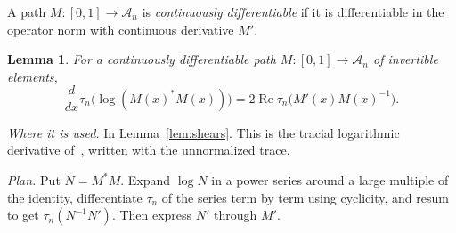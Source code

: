 \documentclass[11pt]{article}
\newtheorem{lemma}[theorem]{Lemma}
\theoremstyle{remark}
\numberwithin{equation}{section}
\begin{document}
A path $M:[0,1]\to\mathcal A_n$ is \emph{continuously differentiable} if it is differentiable in the operator norm with continuous derivative $M'$.

\begin{lemma}\label{lem:logderivative}
For a continuously differentiable path
$M:[0,1]\to\mathcal A_n$ of invertible elements,
\[
 \frac{d}{dx}\tau_n\bigl(\log(M(x)^*M(x))\bigr)
 =2\operatorname{Re}\tau_n\bigl(M'(x)M(x)^{-1}\bigr).
\]
\end{lemma}

\noindent\emph{Where it is used.} In Lemma~\ref{lem:shears}. This is the tracial logarithmic derivative of~\cite[Lemma 2]{FK1952}, written with the unnormalized trace.

\noindent\emph{Plan.} Put $N=M^*M$. Expand $\log N$ in a power series around a large multiple of the identity, differentiate $\tau_n$ of the series term by term using cyclicity, and resum to get $\tau_n(N^{-1}N')$. Then express $N'$ through $M'$.
\end{document}
